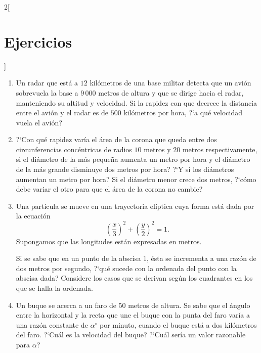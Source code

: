 \begin{multicols}{2}[\section{Ejercicios}]
\begin{enumerate}[leftmargin=*]
\item Un radar que está a $12$ kilómetros de una base militar detecta que un avión sobrevuela
    la base a $9\,000$ metros de altura y que se dirige hacia el radar, manteniendo su altitud
    y velocidad. Si la rapidez con que decrece la distancia entre el avión y el radar es de
    $500$ kilómetros por hora, ?`a qué velocidad vuela el avión?

\item ?`Con qué rapidez varía el área de la corona que queda entre dos circunferencias
    concéntricas de radios $10$ metros y $20$ metros respectivamente, si el diámetro de la más
    pequeña aumenta un metro por hora y el diámetro de la más grande disminuye dos metros por
    hora? ?`Y si los diámetros aumentan un metro por hora? Si el diámetro menor crece dos
    metros, ?`cómo debe variar el otro para que el área de la corona no cambie?

\item Una partícula se mueve en una trayectoria elíptica cuya forma está dada por la ecuación
    \[
      \left(\frac{x}{3}\right)^2 + \left(\frac{y}{2}\right)^2 = 1.
    \]
    Supongamos que las longitudes están expresadas en metros.

    Si se sabe que en un punto de la abscisa $1$, ésta se incrementa a una razón de dos metros
    por segundo, ?`qué sucede con la ordenada del punto con la abscisa dada? Considere los casos
    que se derivan según los cuadrantes en los que se halla la ordenada.

\item Un buque se acerca a un faro de $50$ metros de altura. Se sabe que el ángulo entre la
    horizontal y la recta que une el buque con la punta del faro varía a una razón constante de
    $\alpha^\circ$ por minuto, cuando el buque está a dos kilómetros del faro. ?`Cuál es la
    velocidad del buque? ?`Cuál sería un valor razonable para $\alpha$?
\end{enumerate}
\endgroup
\end{multicols}

